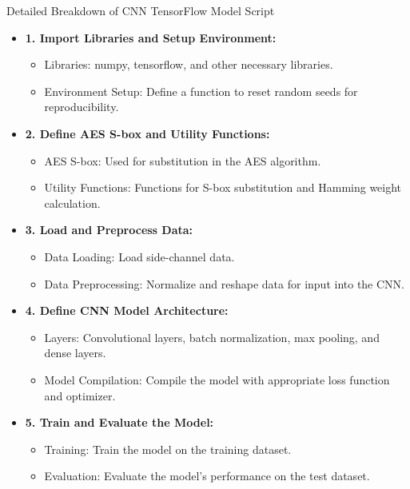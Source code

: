 \documentclass{beamer}
\begin{document}
\begin{frame}{Detailed Breakdown of CNN TensorFlow Model Script}
    \begin{itemize}
        \item \textbf{1. Import Libraries and Setup Environment:}
        \begin{itemize}
            \item Libraries: numpy, tensorflow, and other necessary libraries.
            \item Environment Setup: Define a function to reset random seeds for reproducibility.
        \end{itemize}
        \item \textbf{2. Define AES S-box and Utility Functions:}
        \begin{itemize}
            \item AES S-box: Used for substitution in the AES algorithm.
            \item Utility Functions: Functions for S-box substitution and Hamming weight calculation.
        \end{itemize}
        \item \textbf{3. Load and Preprocess Data:}
        \begin{itemize}
            \item Data Loading: Load side-channel data.
            \item Data Preprocessing: Normalize and reshape data for input into the CNN.
        \end{itemize}
        \item \textbf{4. Define CNN Model Architecture:}
        \begin{itemize}
            \item Layers: Convolutional layers, batch normalization, max pooling, and dense layers.
            \item Model Compilation: Compile the model with appropriate loss function and optimizer.
        \end{itemize}
        \item \textbf{5. Train and Evaluate the Model:}
        \begin{itemize}
            \item Training: Train the model on the training dataset.
            \item Evaluation: Evaluate the model's performance on the test dataset.
        \end{itemize}
    \end{itemize}
\end{frame}
\end{document}
